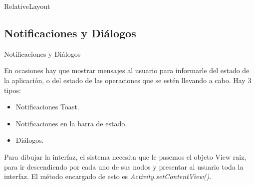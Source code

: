 \begin{frame}[fragile]{RelativeLayout}
    \begin{block}{}
    \end{block}
\end{frame}

\subsection{Notificaciones y Diálogos}
\begin{frame}{Notificaciones y Diálogos}
    \begin{block}{}En ocasiones hay que mostrar mensajes al usuario para
    informarle del estado de la aplicación, o del estado de las operaciones 
    que se estén llevando a cabo. Hay 3 tipos:

	\begin{itemize}
		\item {
			Notificaciones Toast.\pause
		}
		\item {
			Notificaciones en la barra de estado.
		}
		\item <3->{
			Diálogos.
		}
	\end{itemize}
Para dibujar la interfaz, el sistema necesita que le pasemos el objeto View raiz, para ir descendiendo por cada uno de sus nodos y presentar al usuario toda la interfaz. El método encargado de esto es \textit{{Activity.setContentView()}}.
    \end{block}
\end{frame}
